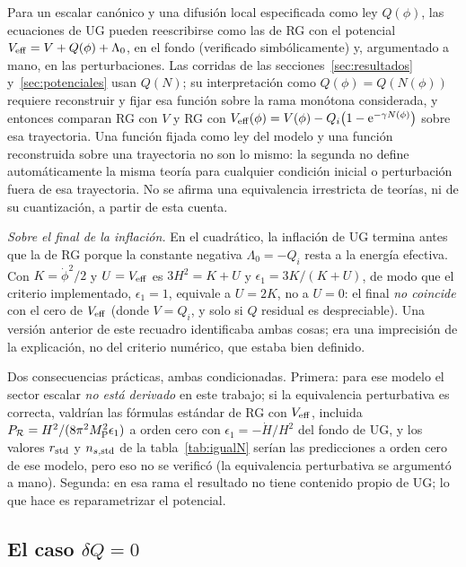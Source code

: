 \begin{resultado}
Para un escalar canónico y una difusión local especificada como ley $Q(\phi)$, las ecuaciones de UG pueden reescribirse como las de RG con el potencial $V_{\rm eff}=V+Q(\phi)+\Lambda_0$, en el fondo (verificado simbólicamente) y, argumentado a mano, en las perturbaciones. Las corridas de las secciones~\ref{sec:resultados} y~\ref{sec:potenciales} usan $Q(N)$; su interpretación como $Q(\phi)=Q(N(\phi))$ requiere reconstruir y fijar esa función sobre la rama monótona considerada, y entonces comparan RG con $V$ y RG con $V_{\rm eff}(\phi)=V(\phi)-Q_i\big(1-\mathrm e^{-\gamma N(\phi)}\big)$ sobre esa trayectoria. Una función fijada como ley del modelo y una función reconstruida sobre una trayectoria no son lo mismo: la segunda no define automáticamente la misma teoría para cualquier condición inicial o perturbación fuera de esa trayectoria. No se afirma una equivalencia irrestricta de teorías, ni de su cuantización, a partir de esta cuenta.

\emph{Sobre el final de la inflación.} En el cuadrático, la inflación de UG termina antes que la de RG porque la constante negativa $\Lambda_0=-Q_i$ resta a la energía efectiva. Con $K=\dot\phi^2/2$ y $U=V_{\rm eff}$ es $3H^2=K+U$ y $\epsilon_1=3K/(K+U)$, de modo que el criterio implementado, $\epsilon_1=1$, equivale a $U=2K$, no a $U=0$: el final \emph{no coincide} con el cero de $V_{\rm eff}$ (donde $V=Q_i$, y solo si $Q$ residual es despreciable). Una versión anterior de este recuadro identificaba ambas cosas; era una imprecisión de la explicación, no del criterio numérico, que estaba bien definido.
\end{resultado}

Dos consecuencias prácticas, ambas condicionadas. Primera: para ese modelo el sector escalar \emph{no está derivado} en este trabajo; si la equivalencia perturbativa es correcta, valdrían las fórmulas estándar de RG con $V_{\rm eff}$, incluida $P_\mathcal{R}=H^2/(8\pi^2M_{\rm P}^2\epsilon_1)$ a orden cero con $\epsilon_1=-\dot H/H^2$ del fondo de UG, y los valores $r_{\rm std}$ y $n_{s,{\rm std}}$ de la tabla~\ref{tab:igualN} serían las predicciones a orden cero de ese modelo, pero eso no se verificó (la equivalencia perturbativa se argumentó a mano). Segunda: en esa rama el resultado no tiene contenido propio de UG; lo que hace es reparametrizar el potencial.

\subsection{El caso $\delta Q=0$}
\label{sec:dQcero}

